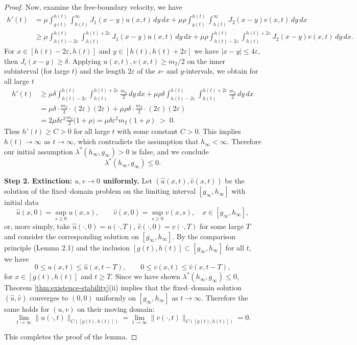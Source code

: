 \documentclass[a4paper,11pt]{amsart}
\theoremstyle{definition}
\numberwithin{equation}{section}
\theoremstyle{definition}
\begin{document}
\begin{proof}
Now, examine the free-boundary velocity, we have
\[
\begin{aligned}
h'(t)
&= \mu\int_{g(t)}^{h(t)}\int_{h(t)}^{\infty} J_1(x-y)u(x,t)\,dy\,dx
+\mu\rho\int_{g(t)}^{h(t)}\int_{h(t)}^{\infty} J_2(x-y)v(x,t)\,dy\,dx \\
&\geq \mu\int_{h(t)-2\varepsilon}^{h(t)}\int_{h(t)}^{h(t)+2\varepsilon} J_1(x-y)u(x,t)\,dy\,dx
+\mu\rho\int_{h(t)-2\varepsilon}^{h(t)}\int_{h(t)}^{h(t)+2\varepsilon} J_2(x-y)v(x,t)\,dy\,dx.
\end{aligned}
\]
For \(x\in[h(t)-2\varepsilon,h(t)]\) and \(y\in[h(t),h(t)+2\varepsilon]\) we have \(|x-y|\leq 4\varepsilon\), then \(J_i(x-y)\ge\delta\). Applying  \(u(x,t),v(x,t)\geq m_2/2\) on the inner subinterval (for large \(t\)) and the length \(2\varepsilon\) of the \(x\)- and \(y\)-intervals, we obtain for all large \(t\)
\[
\begin{aligned}
h'(t)
&\geq \mu\delta \int_{h(t)-2\varepsilon}^{h(t)}\int_{h(t)}^{h(t)+2\varepsilon} \frac{m_2}{2}\,dy\,dx
+ \mu\rho\delta \int_{h(t)-2\varepsilon}^{h(t)}\int_{h(t)}^{h(t)+2\varepsilon} \frac{m_2}{2}\,dy\,dx \\
&= \mu\delta \cdot \frac{m_2}{2}\cdot (2\varepsilon)(2\varepsilon) + \mu\rho\delta \cdot \frac{m_2}{2}\cdot (2\varepsilon)(2\varepsilon) \\
&= 2\mu\delta\varepsilon^2\frac{m_2}{2} \big(1+\rho\big)
= \mu\delta\varepsilon^2 m_2 (1+\rho) \;>\;0.
\end{aligned}
\]
Thus \(h'(t)\geq C>0\) for all large \(t\) with some constant \(C>0\). This implies \(h(t)\to\infty\) as \(t\to\infty\), which contradicts the assumption that \(h_\infty<\infty\). Therefore our initial assumption \(\lambda^\ast(h_\infty,g_\infty)>0\) is false, and we conclude
\[
\lambda^\ast(h_\infty,g_\infty)\leq 0.
\]

\medskip\noindent\textbf{Step 2. Extinction: \(u,v\to0\) uniformly.}
Let \((\widehat u(x,t),\widehat v(x,t))\) be the solution of the fixed–domain problem on the limiting interval \([g_\infty,h_\infty]\) with initial data
\[
\widehat u(x,0)=\sup_{s\geq0} u(x,s),\qquad \widehat v(x,0)=\sup_{s\geq0} v(x,s),
\quad x\in[g_\infty,h_\infty],
\]
or, more simply, take \(\widehat u(\cdot,0)=u(\cdot,T)\), \(\widehat v(\cdot,0)=v(\cdot,T)\) for some large \(T\) and consider the corresponding solution on \([g_\infty,h_\infty]\). By the comparison principle (Lemma 2.1) and the inclusion \( [g(t),h(t)]\subset [g_\infty,h_\infty]\) for all \(t\), we have
\[
0\le u(x,t)\leq \widehat u(x,t-T),\qquad 0\leq v(x,t)\leq \widehat v(x,t-T),
\]
for \(x\in[g(t),h(t)]\) and \(t\geq T\). Since we have shown \(\lambda^\ast(h_\infty,g_\infty)\leq0\), Theorem \eqref{thm:existence-stability}(ii)  implies that the fixed–domain solution \((\widehat u,\widehat v)\) converges to \((0,0)\) uniformly on \([g_\infty,h_\infty]\) as \(t\to\infty\). Therefore the same holds for \((u,v)\) on their moving domain:
\[
\lim_{t\to\infty}\|u(\cdot,t)\|_{C([g(t),h(t)])}
= \lim_{t\to\infty}\|v(\cdot,t)\|_{C([g(t),h(t)])}=0.
\]

This completes the proof of the lemma.
\end{proof}
\end{document}
